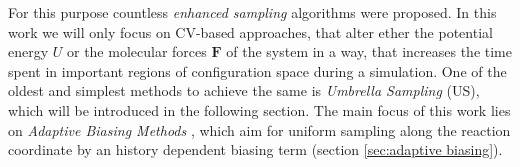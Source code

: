 For this purpose countless \textit{enhanced sampling} algorithms were proposed.\autocite{jiang2010free, sugita1999replica,den2000thermodynamic, kastner2011umbrella, ciccotti2005blue, barducci2008well}
In this work we will only focus on CV-based approaches, that alter ether the potential energy $U$ or the molecular forces $\textbf{F}$ of the system in a way, that increases the time spent in important regions of configuration space during a simulation.
One of the oldest and simplest methods to achieve the same is \textit{Umbrella Sampling} (US)\autocite{kastner2011umbrella}, which will be introduced in the following section.
The main focus of this work lies on \textit{Adaptive Biasing Methods} \autocite{barducci2011metadynamics,comer2015adaptive, lesage2017smoothed}, which aim for uniform sampling along the reaction coordinate by an history dependent biasing term (section \ref{sec:adaptive biasing}).
\newpage

